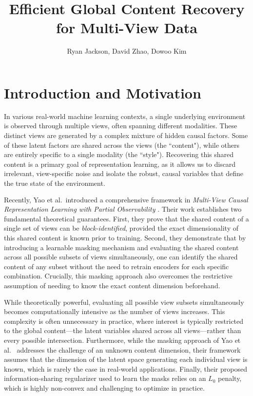 \documentclass[a4paper,12pt]{article}
\title{Efficient Global Content Recovery for Multi-View Data}
\author{Ryan Jackson, David Zhao, Dowoo Kim}
\begin{document}
\maketitle

\section{Introduction and Motivation}
In various real-world machine learning contexts, a single underlying environment is observed through multiple views, often spanning different modalities. These distinct views are generated by a complex mixture of hidden causal factors. Some of these latent factors are shared across the views (the ``content"), while others are entirely specific to a single modality (the ``style"). Recovering this shared content is a primary goal of representation learning, as it allows us to discard irrelevant, view-specific noise and isolate the robust, causal variables that define the true state of the environment.

Recently, Yao et al.\ introduced a comprehensive framework in \textit{Multi-View Causal Representation Learning with Partial Observability} \cite{yao2024multiviewcausalrepresentationlearning}. Their work establishes two fundamental theoretical guarantees. First, they prove that the shared content of a single set of views can be \textit{block-identified}, provided the exact dimensionality of this shared content is known prior to training. Second, they demonstrate that by introducing a learnable masking mechanism and evaluating the shared content across all possible subsets of views simultaneously, one can identify the shared content of any subset without the need to retrain encoders for each specific combination. Crucially, this masking approach also overcomes the restrictive assumption of needing to know the exact content dimension beforehand.

While theoretically powerful, evaluating all possible view subsets simultaneously becomes computationally intensive as the number of views increases.
This complexity is often unnecessary in practice, where interest is typically restricted to the global content—the latent variables shared across all views—rather than every possible intersection.
Furthermore, while the masking approach of Yao et al.\ \cite{yao2024multiviewcausalrepresentationlearning} addresses the challenge of an unknown content dimension, their framework assumes that the dimension of the latent space generating each individual view is known, which is rarely the case in real-world applications.
Finally, their proposed information-sharing regularizer used to learn the masks relies on an $L_0$ penalty, which is highly non-convex and challenging to optimize in practice.
\end{document}
